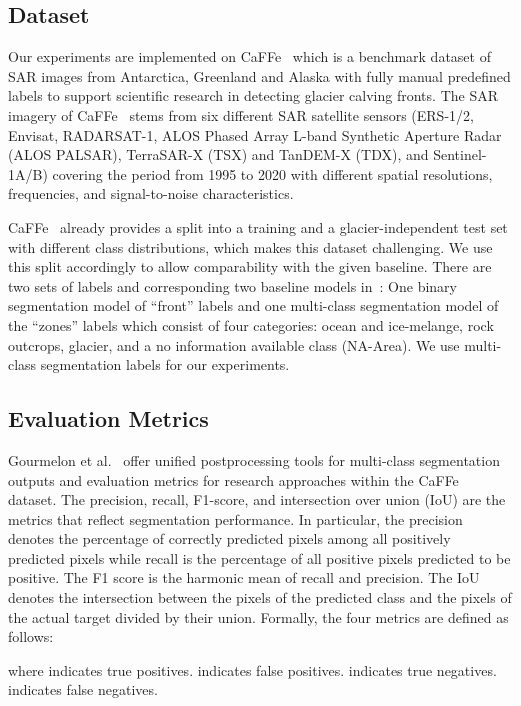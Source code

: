 \documentclass[lettersize,journal,siunitx]{IEEEtran}
\begin{document}
\subsection{Dataset}
Our experiments are implemented on CaFFe~\cite{essd-14-4287-2022} which is a benchmark dataset of SAR images from Antarctica, Greenland and Alaska with fully manual predefined labels to support scientific research in detecting glacier calving fronts. The SAR imagery of CaFFe~\cite{essd-14-4287-2022} stems from six different SAR satellite sensors (ERS-1/2, Envisat, RADARSAT-1, ALOS Phased Array L-band Synthetic Aperture Radar (ALOS PALSAR), TerraSAR-X (TSX) and TanDEM-X (TDX), and Sentinel-1A/B) covering the period from 1995 to 2020 with different spatial resolutions, frequencies, and signal-to-noise characteristics.

CaFFe~\cite{essd-14-4287-2022} already provides a split into a training and a glacier-independent test set with different class distributions, which makes this dataset challenging. We use this split accordingly to allow comparability with the given baseline. There are two sets of labels and corresponding two baseline models in~\cite{essd-14-4287-2022}: One binary segmentation model of “front” labels and one multi-class segmentation model of the “zones” labels which consist of four categories: ocean and ice-melange, rock outcrops, glacier, and a no information available class (NA-Area). We use multi-class segmentation labels for our experiments.

\subsection{Evaluation Metrics}
Gourmelon et al.~\cite{essd-14-4287-2022} offer unified postprocessing tools for multi-class segmentation outputs and evaluation metrics for research approaches within the CaFFe~\cite{essd-14-4287-2022} dataset. The precision, recall, F1-score, and intersection over union (IoU) are the metrics that reflect segmentation performance. In particular, the precision denotes the percentage of correctly predicted pixels among all positively predicted pixels while recall is the percentage of all positive pixels predicted to be positive. The F1 score is the harmonic mean of recall and precision. The IoU denotes the intersection between the pixels of the predicted class and the pixels of the actual target divided by their union. Formally, the four metrics are defined as follows:




where  indicates true positives.  indicates false positives.  indicates true negatives.  indicates false negatives.
\end{document}
